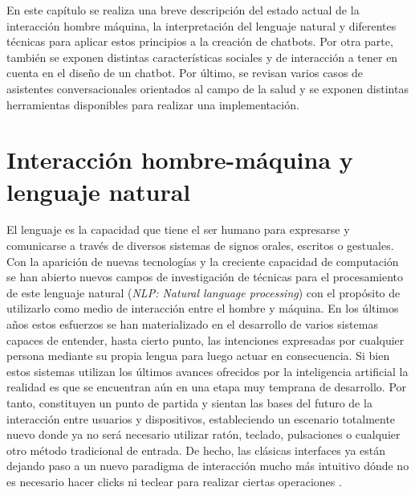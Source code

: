 En este capítulo se realiza una breve descripción del estado actual de la interacción hombre máquina, la interpretación del lenguaje natural y diferentes técnicas para aplicar estos principios a la creación de chatbots. Por otra parte, también se exponen distintas características sociales y de interacción a tener en cuenta en el diseño de un chatbot. Por último, se revisan varios casos de asistentes conversacionales orientados al campo de la salud y se exponen distintas herramientas disponibles para realizar una implementación.\\

\section{Interacción hombre-máquina y lenguaje natural}

El lenguaje es la capacidad que tiene el ser humano para expresarse y comunicarse a través de diversos sistemas de signos orales, escritos o gestuales. Con la aparición de nuevas tecnologías y la creciente capacidad de computación se han abierto nuevos campos de investigación de técnicas para el procesamiento de este lenguaje natural (\textit{NLP: Natural language processing}) con el propósito de utilizarlo como medio de interacción entre el hombre y máquina. En los últimos años estos esfuerzos se han materializado en el desarrollo de varios sistemas capaces de entender, hasta cierto punto, las intenciones expresadas por cualquier persona mediante su propia lengua para luego actuar en consecuencia. Si bien estos sistemas utilizan los últimos avances ofrecidos por la inteligencia artificial la realidad es que se encuentran aún en una etapa muy temprana de desarrollo. Por tanto, constituyen un punto de partida y sientan las bases del futuro de la interacción entre usuarios y dispositivos, estableciendo un escenario totalmente nuevo donde ya no será necesario utilizar ratón, teclado, pulsaciones o cualquier otro método tradicional de entrada. De hecho, las clásicas interfaces ya están dejando paso a un nuevo paradigma de interacción mucho más intuitivo dónde no es necesario hacer clicks ni teclear para realizar ciertas operaciones \cite{conversationSystems,shouldInteract}.\\

